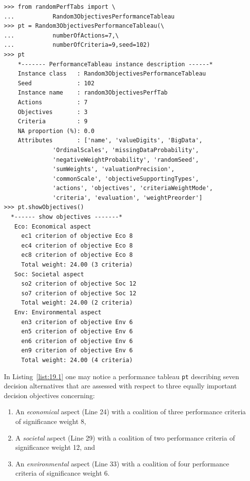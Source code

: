 \begin{lstlisting}[caption={Generate a Random 3 Objectives Performance Tableau},label=list:19.1]
>>> from randomPerfTabs import \
...           Random3ObjectivesPerformanceTableau
>>> pt = Random3ObjectivesPerformanceTableau(\
...           numberOfActions=7,\
...           numberOfCriteria=9,seed=102)
>>> pt
    *------- PerformanceTableau instance description ------*
    Instance class   : Random3ObjectivesPerformanceTableau
    Seed             : 102
    Instance name    : random3ObjectivesPerfTab
    Actions          : 7
    Objectives       : 3
    Criteria         : 9
    NA proportion (%): 0.0
    Attributes       : ['name', 'valueDigits', 'BigData',
              'OrdinalScales', 'missingDataProbability',
              'negativeWeightProbability', 'randomSeed',
              'sumWeights', 'valuationPrecision',
              'commonScale', 'objectiveSupportingTypes',
              'actions', 'objectives', 'criteriaWeightMode',
              'criteria', 'evaluation', 'weightPreorder']
>>> pt.showObjectives()
  *------ show objectives -------*
   Eco: Economical aspect
     ec1 criterion of objective Eco 8
     ec4 criterion of objective Eco 8
     ec8 criterion of objective Eco 8
     Total weight: 24.00 (3 criteria)
   Soc: Societal aspect
     so2 criterion of objective Soc 12
     so7 criterion of objective Soc 12
     Total weight: 24.00 (2 criteria)
   Env: Environmental aspect
     en3 criterion of objective Env 6
     en5 criterion of objective Env 6
     en6 criterion of objective Env 6
     en9 criterion of objective Env 6
     Total weight: 24.00 (4 criteria)
\end{lstlisting}
In Listing~\vref{list:19.1} one may notice a performance tableau \texttt{pt} describing seven decision alternatives that are assessed with respect to three equally important decision objectives concerning:
\begin{enumerate}[topsep=1pt]
\item An \emph{economical} aspect (Line 24) with a coalition of three performance criteria of significance weight 8,
\item A \emph{societal} aspect (Line 29) with a coalition of two performance criteria of significance weight 12, and
\item An \emph{environmental} aspect (Line 33) with a coalition of four performance criteria of significance weight 6.
\end{enumerate}


